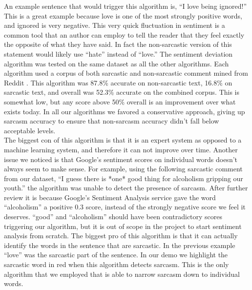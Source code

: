 \documentclass[conference]{IEEEtran}
\begin{document}
An example sentence that would trigger this algorithm is, “I love being ignored!” This is a great example because love is one of the most strongly positive words, and ignored is very negative. This very quick fluctuation in sentiment is a common tool that an author can employ to tell the reader that they feel exactly the opposite of what they have said. In fact the non-sarcastic version of this statement would likely use “hate” instead of “love.”  The sentiment deviation algorithm was tested on the same dataset as all the other algorithms. Each algorithm used a corpus of both sarcastic and non-sarcastic comment mined from Reddit \cite{b5}. This algorithm was 87.8\% accurate on non-sarcastic text, 16.8\% on sarcastic text, and overall was 52.3\% accurate on the combined corpus. This is somewhat low, but any score above 50\% overall is an improvement over what exists today. In all our algorithms we favored a conservative approach, giving up sarcasm accuracy to ensure that non-sarcasm accuracy didn’t fall below acceptable levels. \\
The biggest con of this algorithm is that it is an expert system as opposed to a machine learning system, and therefore it can not improve over time. Another issue we noticed is that Google’s sentiment scores on individual words doesn’t always seem to make sense. For example, using the following sarcastic comment from our dataset, “I guess there is *one* good thing for alcoholism gripping our youth.” the algorithm was unable to detect the presence of sarcasm. After further review it is because Google’s Sentiment Analysis service gave the word “alcoholism” a positive 0.3 score, instead of the strongly negative score we feel it deserves. “good” and “alcoholism” should have been contradictory scores triggering our algorithm, but it is out of scope in the project to start sentiment analysis from scratch. The biggest pro of this algorithm is that it can actually identify the words in the sentence that are sarcastic. In the previous example “love” was the sarcastic part of the sentence. In our demo we highlight the sarcastic word in red when this algorithm detects sarcasm. This is the only algorithm that we employed that is able to narrow sarcasm down to individual words. \\
\end{document}
